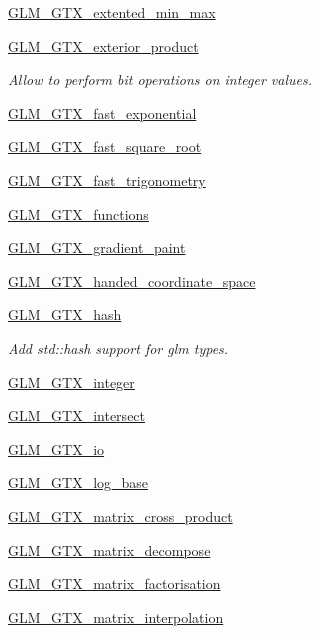 \begin{DoxyCompactItemize}
\hyperlink{group__gtx__extended__min__max}{G\+L\+M\+\_\+\+G\+T\+X\+\_\+extented\+\_\+min\+\_\+max}
\item 
\hyperlink{group__gtx__exterior__product}{G\+L\+M\+\_\+\+G\+T\+X\+\_\+exterior\+\_\+product}
\begin{DoxyCompactList}\small\item\em Allow to perform bit operations on integer values. \end{DoxyCompactList}\item 
\hyperlink{group__gtx__fast__exponential}{G\+L\+M\+\_\+\+G\+T\+X\+\_\+fast\+\_\+exponential}
\item 
\hyperlink{group__gtx__fast__square__root}{G\+L\+M\+\_\+\+G\+T\+X\+\_\+fast\+\_\+square\+\_\+root}
\item 
\hyperlink{group__gtx__fast__trigonometry}{G\+L\+M\+\_\+\+G\+T\+X\+\_\+fast\+\_\+trigonometry}
\item 
\hyperlink{group__gtx__functions}{G\+L\+M\+\_\+\+G\+T\+X\+\_\+functions}
\item 
\hyperlink{group__gtx__gradient__paint}{G\+L\+M\+\_\+\+G\+T\+X\+\_\+gradient\+\_\+paint}
\item 
\hyperlink{group__gtx__handed__coordinate__space}{G\+L\+M\+\_\+\+G\+T\+X\+\_\+handed\+\_\+coordinate\+\_\+space}
\item 
\hyperlink{group__gtx__hash}{G\+L\+M\+\_\+\+G\+T\+X\+\_\+hash}
\begin{DoxyCompactList}\small\item\em Add std\+::hash support for glm types. \end{DoxyCompactList}\item 
\hyperlink{group__gtx__integer}{G\+L\+M\+\_\+\+G\+T\+X\+\_\+integer}
\item 
\hyperlink{group__gtx__intersect}{G\+L\+M\+\_\+\+G\+T\+X\+\_\+intersect}
\item 
\hyperlink{group__gtx__io}{G\+L\+M\+\_\+\+G\+T\+X\+\_\+io}
\item 
\hyperlink{group__gtx__log__base}{G\+L\+M\+\_\+\+G\+T\+X\+\_\+log\+\_\+base}
\item 
\hyperlink{group__gtx__matrix__cross__product}{G\+L\+M\+\_\+\+G\+T\+X\+\_\+matrix\+\_\+cross\+\_\+product}
\item 
\hyperlink{group__gtx__matrix__decompose}{G\+L\+M\+\_\+\+G\+T\+X\+\_\+matrix\+\_\+decompose}
\item 
\hyperlink{group__gtx__matrix__factorisation}{G\+L\+M\+\_\+\+G\+T\+X\+\_\+matrix\+\_\+factorisation}
\item 
\hyperlink{group__gtx__matrix__interpolation}{G\+L\+M\+\_\+\+G\+T\+X\+\_\+matrix\+\_\+interpolation}

\end{DoxyCompactItemize}
